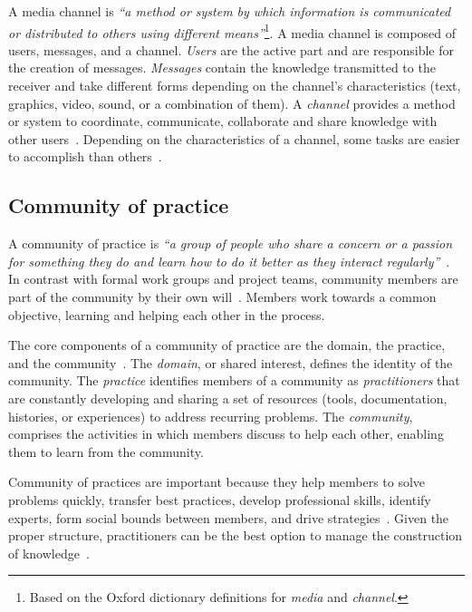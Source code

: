     A media channel is \textit{``a method or system by which information is communicated or distributed to others using different means''}\footnote{Based on the Oxford dictionary definitions for \emph{media} and \emph{channel}.}.
    A media channel is composed of users, messages, and a channel.
    \textit{Users} are the active part and are responsible for the creation of messages.
    \textit{Messages} contain the knowledge transmitted to the receiver and take different forms depending on the channel's characteristics (text, graphics, video, sound, or a combination of them).
    A \textit{channel} provides a method or system to coordinate, communicate, collaborate and share knowledge with other users~\cite{Storey2014}.
    Depending on the characteristics of a channel, some tasks are easier to accomplish than others~\cite{Storey2014,Vasilescu2014b}.

\subsection{Community of practice}

    A community of practice is \textit{``a group of people who share a concern or a passion for something they do and learn how to do it better as they interact regularly''}~\cite{Wenger2000}.
    In contrast with formal work groups and project teams, community members are part of the community by their own will~\cite{Wenger2000}.
    Members work towards a common objective, learning and helping each other in the process.

    The core components of a community of practice are the domain, the practice, and the community~\cite{Wenger2011}.
    The \textit{domain}, or shared interest, defines the identity of the community.
    The \textit{practice} identifies members of a community as \textit{practitioners} that are constantly developing and sharing a set of resources (tools, documentation, histories, or experiences) to address recurring problems. 
    The \textit{community}, comprises the activities in which members discuss to help each other, enabling them to learn from the community.

    Community of practices are important because they help members to solve problems quickly, transfer best practices, develop professional skills, identify experts, form social bounds between members, and drive strategies~\cite{Wenger2011, Storey2014}.
    Given the proper structure, practitioners can be the best option to manage the construction of knowledge~\cite{Wenger2011}.


